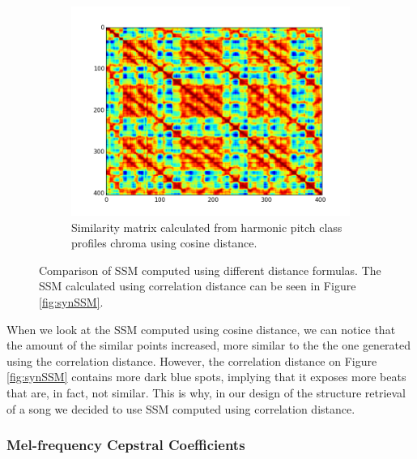 \begin{figure}[b]
\begin{subfigure}[b]{0.31\textwidth}
                \label{fig:manhattan}
        \end{subfigure}
         \begin{subfigure}[b]{0.31\textwidth}
                \includegraphics[width=\textwidth]{Figures/ssm_cosine}
                \caption{Similarity matrix calculated from harmonic pitch class profiles chroma using cosine distance.}
                \label{fig:cosine}
        \end{subfigure}
          \caption{Comparison of SSM computed using different distance formulas. The SSM calculated using correlation distance can be seen in Figure \ref{fig:synSSM}.}
        \label{fig:ssmdistance}
\end{figure}


When we look at the SSM computed using cosine distance, we can notice that the amount of the similar points increased, more similar to the the one generated using the correlation distance. However, the correlation distance on Figure \ref{fig:synSSM} contains more dark blue spots, implying that it exposes more beats that are, in fact, not similar. This is why, in our design of the structure retrieval of a song we decided to use SSM computed using correlation distance.

\vspace{10pt}

\subsubsection*{Mel-frequency Cepstral Coefficients}

